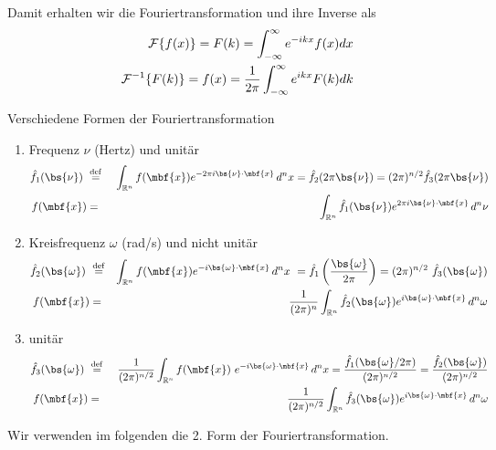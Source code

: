 Damit erhalten wir die Fouriertransformation und ihre Inverse als
\begin{eqnarray}\label{eq:fouriertrafo}
{\cal F}\{f(x)\}=F(k)=\int_{-\infty}^{\infty}e^{-ikx}f(x)dx\label{eq:fourierhin}\\
{\cal F}^{-1}\{F(k)\}=f(x)=\frac{1}{2\pi}\int_{-\infty}^{\infty}e^{ikx}F(k)dk\label{eq:fourierrueck}
\end{eqnarray}
\begin{note}{Verschiedene Formen der Fouriertransformation}
	\begin{enumerate}
		\item Frequenz $\nu$ (Hertz) und unitär
		\begin{eqnarray*}
			\hat{f}_1(\bs{\nu})\ &\stackrel{\mathrm{def}}{=}&\
			\int_{\mathbb{R}^n} f(\mbf{x}) e^{-2 \pi i \bs{\nu}\cdot\mbf{x}}\, d^nx =
			\hat{f}_2(2 \pi \bs{\nu})=(2 \pi)^{n/2}\hat{f}_3(2 \pi \bs{\nu})\\
			f(\mbf{x}) &=& \int_{\mathbb{R}^n} \hat{f}_1(\bs{\nu}) e^{2 \pi i
			\bs{\nu}\cdot\mbf{x}}\, d^n\nu 
		\end{eqnarray*}
		\item Kreisfrequenz $\omega$ (rad/s) und nicht unitär
		\begin{eqnarray*}
			\hat{f}_2(\bs{\omega}) \
			&\stackrel{\mathrm{def}}{=}&\int_{\mathbb{R}^n} f(\mbf{x})
			e^{-i\bs{\omega}\cdot \mbf{x}} \, d^nx \ = \hat{f}_1 \left (
			\frac{\bs{\omega}}{2 \pi} \right ) = (2 \pi)^{n/2}\
			\hat{f}_3(\bs{\omega})\\ 
			f(\mbf{x}) &=& \frac{1}{(2 \pi)^n} \int_{\mathbb{R}^n}
			\hat{f}_2(\bs{\omega}) e^{i \bs{\omega}\cdot \mbf{x}} \, d^n\omega 
		\end{eqnarray*}
		\item unitär
		\begin{eqnarray*}
			\hat{f}_3(\bs{\omega}) \ &\stackrel{\mathrm{def}}{=}&\
			\frac{1}{(2 \pi)^{n/2}} \int_{\mathbb{R}^n} f(\mbf{x}) \
			e^{-i \bs{\omega}\cdot \mbf{x}}\, d^nx = 
			\frac{\hat{f}_1(\bs{\omega}/2\pi)}{(2 \pi)^{n/2}}
			 =
			\frac{\hat{f}_2(\bs{\omega})}{(2 \pi)^{n/2}} \\ 
			f(\mbf{x}) &=& \frac{1}{(2 \pi)^{n/2}} \int_{\mathbb{R}^n}
			\hat{f}_3(\bs{\omega})e^{i \bs{\omega}\cdot \mbf{x}}\, d^n\omega
		\end{eqnarray*}
	\end{enumerate}
\end{note}
Wir verwenden im folgenden die 2. Form der Fouriertransformation.


